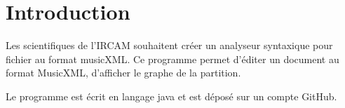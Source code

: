 \section{Introduction}

Les scientifiques de l'IRCAM souhaitent créer un analyseur syntaxique pour fichier au format musicXML. Ce programme permet d'éditer un document au format MusicXML, d'afficher le graphe de la partition.

Le programme est écrit en langage java et est déposé sur un compte GitHub.